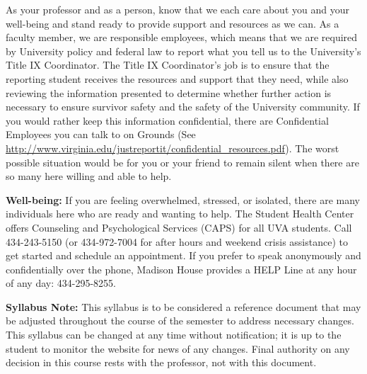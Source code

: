 \documentclass[12pt]{article}
\begin{document}
As your professor and as a person, know that we each care about you and your well-being and stand ready to provide support and resources as we can. As a faculty member, we are responsible employees, which means that we are required by University policy and federal law to report what you tell us to the University's Title IX Coordinator. The Title IX Coordinator's job is to ensure that the reporting student receives the resources and support that they need, while also reviewing the information presented to determine whether further action is necessary to ensure survivor safety and the safety of the University community. If you would rather keep this information confidential, there are Confidential Employees you can talk to on Grounds (See \url{http://www.virginia.edu/justreportit/confidential\_resources.pdf}). The worst possible situation would be for you or your friend to remain silent when there are so many here willing and able to help.

\textbf{Well-being:} If you are feeling overwhelmed, stressed, or isolated, there are many individuals here who are ready and wanting to help. The Student Health Center offers Counseling and Psychological Services (CAPS) for all UVA students. Call 434-243-5150 (or 434-972-7004 for after hours and weekend crisis assistance) to get started and schedule an appointment. If you prefer to speak anonymously and confidentially over the phone, Madison House provides a HELP Line at any hour of any day: 434-295-8255.

\textbf{Syllabus Note:} This syllabus is to be considered a reference document that may be adjusted throughout the course of the semester to address necessary changes. This syllabus can be changed at any time without notification; it is up to the student to monitor the website for news of any changes. Final authority on any decision in this course rests with the professor, not with this document.
\end{document}
